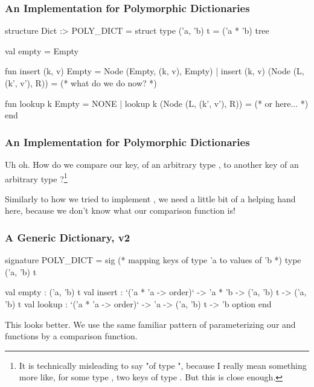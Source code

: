 \documentclass[aspectratio=169, handout]{beamer}
\begin{document}
\begin{frame}[fragile]
  \frametitle{An Implementation for Polymorphic Dictionaries}

  { \small
  \begin{codeblock}
    structure Dict :> POLY_DICT =
      struct
        type ('a, 'b) t = ('a * 'b) tree

        val empty = Empty

        fun insert (k, v) Empty = Node (Empty, (k, v), Empty)
          | insert (k, v) (Node (L, (k', v'), R)) =
              (* what do we do now? *)

        fun lookup k Empty = NONE
          | lookup k (Node (L, (k', v'), R)) =
              (* or here... *)
    end
  \end{codeblock}
  }

\end{frame}

\begin{frame}[fragile]
  \frametitle{An Implementation for Polymorphic Dictionaries}

  Uh oh. How do we compare our key, of an arbitrary type , to
  another key of an arbitrary type ?\footnote{
    It is technically misleading to say "of type ",
    because I really mean something more like, for some type , two
    keys of type . But this is close enough.
  }

  \pause
  \vspace{\fill}

  Similarly to how we tried to implement ,
  we need a little bit of a helping hand here, because we don't know what
  our comparison function is!
\end{frame}

\begin{frame}[fragile]
  \frametitle{A Generic Dictionary, v2}

  {\small
  \begin{codeblock}
    signature POLY_DICT =
      sig
        (* mapping keys of type 'a to values of 'b *)
        type ('a, 'b) t

        val empty : ('a, 'b) t
        val insert :
          `('a * 'a -> order)` -> 'a * 'b -> ('a, 'b) t -> ('a, 'b) t
        val lookup :
          `('a * 'a -> order)` -> 'a -> ('a, 'b) t -> 'b option
      end
  \end{codeblock}
  }

  \pause
  \vspace{\fill}

  This looks better. We use the same familiar pattern of parameterizing our
   and  functions by a comparison function.
\end{frame}
\end{document}
